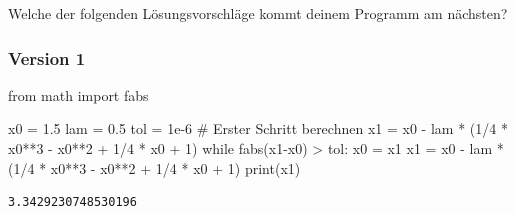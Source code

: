 \documentclass[
  letterpaper,
  DIV=11,
  oneside]{scrreprt}
\newenvironment{Shaded}{\begin{snugshade}}{\end{snugshade}}
\newcommand{\BuiltInTok}[1]{\textcolor[rgb]{0.00,0.23,0.31}{#1}}
\newcommand{\CommentTok}[1]{\textcolor[rgb]{0.37,0.37,0.37}{#1}}
\newcommand{\ControlFlowTok}[1]{\textcolor[rgb]{0.00,0.23,0.31}{#1}}
\newcommand{\DecValTok}[1]{\textcolor[rgb]{0.68,0.00,0.00}{#1}}
\newcommand{\FloatTok}[1]{\textcolor[rgb]{0.68,0.00,0.00}{#1}}
\newcommand{\ImportTok}[1]{\textcolor[rgb]{0.00,0.46,0.62}{#1}}
\newcommand{\NormalTok}[1]{\textcolor[rgb]{0.00,0.23,0.31}{#1}}
\newcommand{\OperatorTok}[1]{\textcolor[rgb]{0.37,0.37,0.37}{#1}}
\theoremstyle{definition}
\theoremstyle{definition}
\theoremstyle{remark}
\begin{document}
\begin{tcolorbox}[enhanced jigsaw, colframe=quarto-callout-tip-color-frame, colback=white, opacityback=0, toptitle=1mm, bottomrule=.15mm, breakable, title=\textcolor{quarto-callout-tip-color}{\faLightbulb}\hspace{0.5em}{Lösung}, toprule=.15mm, colbacktitle=quarto-callout-tip-color!10!white, leftrule=.75mm, titlerule=0mm, coltitle=black, bottomtitle=1mm, arc=.35mm, rightrule=.15mm, left=2mm, opacitybacktitle=0.6]

Welche der folgenden Lösungsvorschläge kommt deinem Programm am
nächsten?

\hypertarget{version-1-1}{%
\subsubsection{Version 1}\label{version-1-1}}

\begin{Shaded}
\begin{Highlighting}[]
\ImportTok{from}\NormalTok{ math }\ImportTok{import}\NormalTok{ fabs}

\NormalTok{x0 }\OperatorTok{=} \FloatTok{1.5}
\NormalTok{lam }\OperatorTok{=} \FloatTok{0.5}
\NormalTok{tol }\OperatorTok{=} \FloatTok{1e{-}6}
\CommentTok{\# Erster Schritt berechnen}
\NormalTok{x1 }\OperatorTok{=}\NormalTok{ x0 }\OperatorTok{{-}}\NormalTok{ lam }\OperatorTok{*}\NormalTok{ (}\DecValTok{1}\OperatorTok{/}\DecValTok{4} \OperatorTok{*}\NormalTok{ x0}\OperatorTok{**}\DecValTok{3} \OperatorTok{{-}}\NormalTok{ x0}\OperatorTok{**}\DecValTok{2} \OperatorTok{+} \DecValTok{1}\OperatorTok{/}\DecValTok{4} \OperatorTok{*}\NormalTok{ x0 }\OperatorTok{+} \DecValTok{1}\NormalTok{)}
\ControlFlowTok{while}\NormalTok{ fabs(x1}\OperatorTok{{-}}\NormalTok{x0) }\OperatorTok{\textgreater{}}\NormalTok{ tol:}
\NormalTok{    x0 }\OperatorTok{=}\NormalTok{ x1}
\NormalTok{    x1 }\OperatorTok{=}\NormalTok{ x0 }\OperatorTok{{-}}\NormalTok{ lam }\OperatorTok{*}\NormalTok{ (}\DecValTok{1}\OperatorTok{/}\DecValTok{4} \OperatorTok{*}\NormalTok{ x0}\OperatorTok{**}\DecValTok{3} \OperatorTok{{-}}\NormalTok{ x0}\OperatorTok{**}\DecValTok{2} \OperatorTok{+} \DecValTok{1}\OperatorTok{/}\DecValTok{4} \OperatorTok{*}\NormalTok{ x0 }\OperatorTok{+} \DecValTok{1}\NormalTok{)}
\BuiltInTok{print}\NormalTok{(x1)}
\end{Highlighting}
\end{Shaded}

\begin{verbatim}
3.3429230748530196
\end{verbatim}


\end{tcolorbox}
\end{document}
